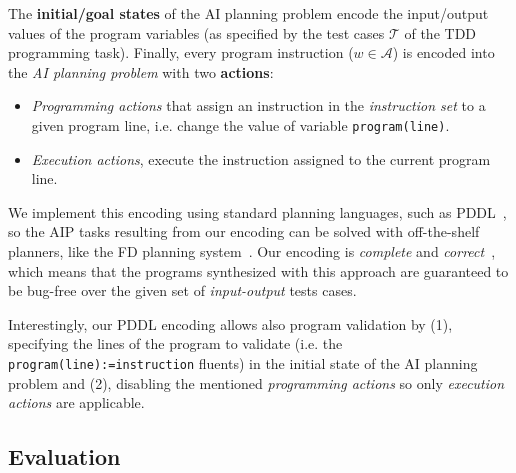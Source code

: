 \documentclass[10pt,a4paper]{paper}
\begin{document}
The {\bf initial/goal states} of the AI planning problem encode the input/output values of the program variables (as specified by the test cases ${\mathcal T}$ of the TDD programming task). Finally, every program instruction ($w\in {\mathcal A}$) is encoded into the {\em AI planning problem} with two {\bf actions}:
\begin{itemize}
\item {\it Programming actions} that assign an instruction in the {\em instruction set} to a given program line, i.e. change the value of variable {\tt program(line)}.
\item {\it Execution actions}, execute the instruction assigned to the current program line.
\end{itemize}
We implement this encoding using standard planning languages, such as PDDL~\cite{fox2003pddl2}, so the AIP tasks resulting from our encoding can be solved with off-the-shelf planners, like the {\sc FD} planning system~\cite{helmert2006fast}. Our encoding is {\em complete} and {\em correct}~\cite{segovia:programs:AIJ19}, which means that the programs synthesized with this approach are guaranteed to be bug-free over the given set of {\em input-output} tests cases.

Interestingly, our PDDL encoding allows also program validation by (1), specifying the lines of the program to validate (i.e. the {\tt program(line):=instruction} fluents) in the initial state of the AI planning problem and (2), disabling the mentioned {\it programming actions} so only {\it execution actions} are applicable.


\subsection{Evaluation}
\label{sec:evaluation}
\end{document}
